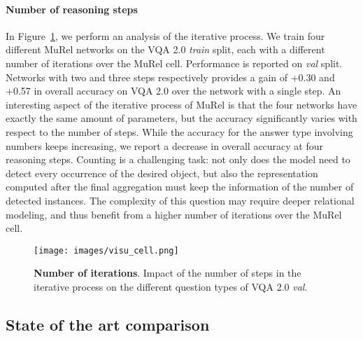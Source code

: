\documentclass[10pt,twocolumn,letterpaper]{article}
\begin{document}
\paragraph{Number of reasoning steps} In Figure~\ref{fig:impact_nb_cell},
we perform an analysis of the iterative process. 
We train four different MuRel networks on the VQA 2.0 \textit{train} split, each with a different number of iterations over the MuRel cell. Performance is reported on \textit{val} split.
Networks with two and three steps respectively provides a gain of +0.30 and +0.57 in overall accuracy on VQA 2.0 over the network with a single step. 
An interesting aspect of the iterative process of MuRel is that the four networks have exactly the same amount of parameters, but the accuracy significantly varies with respect to the number of steps.
While the accuracy for the answer type involving numbers keeps increasing, we report a decrease in overall accuracy at four reasoning steps. 
Counting is a challenging task: not only does the model need to detect every occurrence of the desired object, but also the representation computed after the final aggregation must keep the information of the number of detected instances. The complexity of this question may require deeper relational modeling, and thus benefit from a higher number of iterations over the MuRel cell.

\begin{figure}
    \centering
    \texttt{[image: images/visu\_cell.png]}
    \caption{\label{fig:impact_nb_cell} \textbf{Number of iterations}. Impact of the number of steps in the iterative process on the different question types of VQA 2.0 \textit{val}.}
\end{figure}


\subsection{State of the art comparison}
\end{document}
